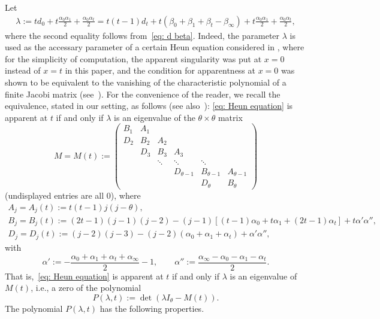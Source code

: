 \documentclass[10pt,a4paper]{amsart}
\numberwithin{equation}{section}
\begin{document}
Let
\begin{gather} \label{eq: lambda}
 \lambda:=td_0+t\frac{\alpha_0\alpha_1}2
 +\frac{\alpha_0\alpha_t}2
 =t(t-1)d_t+t(\beta_0+\beta_1+\beta_t-\beta_\infty)
 +t\frac{\alpha_0\alpha_1}2+\frac{\alpha_0\alpha_t}2,
\end{gather}
where the second equality follows from~\eqref{eq: d beta}. Indeed,
the parameter $\lambda$ is used as the accessary parameter of a
certain Heun equation considered in \cite{Quadrilateral}, where for
the simplicity of computation, the apparent singularity was put at
$x=0$ instead of $x=t$ in this paper, and the condition for
apparentness at $x=0$ was shown to be equivalent to the vanishing of
the characteristic polynomial of a finite Jacobi matrix (see~\cite[Proposition 2.4 and equation~(2.8)]{Quadrilateral}). For the
convenience of the reader, we recall the equivalence, stated in our
setting, as follows (see also~\mbox{\cite[Lemma B.8]{Chen-Lin-Yang}}):
\eqref{eq: Heun equation} is apparent at $t$ if and only if
 $\lambda$ is an eigenvalue of the $\theta\times\theta$ matrix
 \begin{equation} \label{eq: M}
 M=M(t):=\begin{pmatrix}
 B_1 & A_1 & & & & \\
 D_2 & B_2 & A_2 & & & \\
 & D_3 & B_3 & A_3 & & \\
 & & \ddots & \ddots & \ddots & \\
 & & & D_{\theta-1} & B_{\theta-1} & A_{\theta-1} \\
 & & & & D_{\theta} & B_{\theta} \end{pmatrix}
 \end{equation}
 (undisplayed entries are all $0$), where
 \begin{gather*}
 A_j =A_j(t):=t(t-1)j(j-\theta), \\
 B_j =B_j(t):=(2t-1)(j-1)(j-2) -(j-1)[(t-1)\alpha_0+t\alpha_1
 +(2t-1)\alpha_t]
 +t\alpha'\alpha'', \\
 D_j =D_j(t):=(j-2)(j-3)-(j-2)(\alpha_0+\alpha_1+\alpha_t)
 +\alpha'\alpha'',
 \end{gather*}
 with
\[
 \alpha':=-\frac{\alpha_0+\alpha_1+\alpha_t+\alpha_\infty}2-1,
 \qquad \alpha'':=\frac{\alpha_\infty-\alpha_0-\alpha_1-\alpha_t}2.
\]
 That is,~\eqref{eq: Heun equation} is apparent at $t$ if and only if
 $\lambda$ is an eigenvalue of $M(t)$, i.e., a zero of the polynomial
\[
 P(\lambda,t):=\det(\lambda I_\theta-M(t)).
\]
 The polynomial $P(\lambda,t)$ has the following properties.
\end{document}
